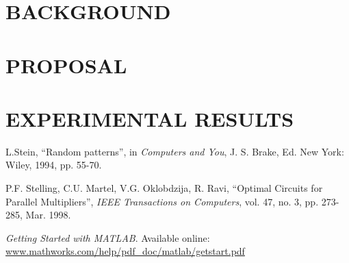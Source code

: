 \documentclass[12pt, a4paper]{report}
\begin{document}





\part{BACKGROUND}




\part{PROPOSAL}
\part{EXPERIMENTAL RESULTS}




%
%



%
%

\begin{thebibliography}{9}
L.Stein, ``Random patterns'', in \emph{Computers and You}, J. S. Brake, Ed. New York: Wiley, 1994, pp. 55-70.

P.F. Stelling, C.U. Martel, V.G. Oklobdzija, R. Ravi, ``Optimal Circuits for Parallel Multipliers'', \emph{IEEE Transactions on Computers}, vol. 47, no. 3, pp. 273-285, Mar. 1998.

\emph{Getting Started with MATLAB}. Available online: \url{www.mathworks.com/help/pdf_doc/matlab/getstart.pdf}

\end{thebibliography}
\end{document}
